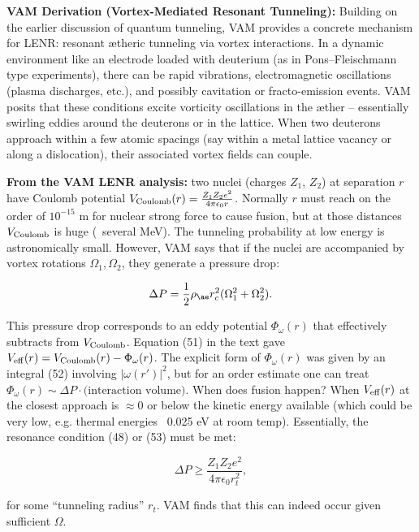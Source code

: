 \documentclass[a4paper, aps,preprint,superscriptaddress, 12pt]{revtex4}
\begin{document}
\textbf{VAM Derivation (Vortex-Mediated Resonant Tunneling):} Building on the earlier discussion of quantum tunneling, VAM provides a concrete mechanism for LENR: resonant ætheric tunneling via vortex interactions. In a dynamic environment like an electrode loaded with deuterium (as in Pons–Fleischmann type experiments), there can be rapid vibrations, electromagnetic oscillations (plasma discharges, etc.), and possibly cavitation or fracto-emission events. VAM posits that these conditions excite vorticity oscillations in the æther – essentially swirling eddies around the deuterons or in the lattice. When two deuterons approach within a few atomic spacings (say within a metal lattice vacancy or along a dislocation), their associated vortex fields can couple.


\textbf{From the VAM LENR analysis:} two nuclei (charges $Z_1$, $Z_2$) at separation $r$ have Coulomb potential $V_{\rm Coulomb}(r) = \frac{Z_1 Z_2 e^2}{4\pi\epsilon_0 r}$. Normally $r$ must reach on the order of $10^{-15}$ m for nuclear strong force to cause fusion, but at those distances $V_{\rm Coulomb}$ is huge (~several MeV). The tunneling probability at low energy is astronomically small. However, VAM says that if the nuclei are accompanied by vortex rotations $\Omega_1, \Omega_2$, they generate a pressure drop:

\begin{equation}
    \Delta P = \frac{1}{2}\rho_{\ae} r_c^2 (\Omega_1^2+\Omega_2^2).
\end{equation}

This pressure drop corresponds to an eddy potential $\Phi_\omega(r)$ that effectively subtracts from $V_{\rm Coulomb}$. Equation (51) in the text gave $V_{\rm eff}(r) = V_{\rm Coulomb}(r) - \Phi_\omega(r)$. The explicit form of $\Phi_\omega(r)$ was given by an integral (52) involving $|\omega(r')|^2$, but for an order estimate one can treat $\Phi_\omega(r)\sim \Delta P \cdot \text{(interaction volume)}$. When does fusion happen? When $V_{\rm eff}(r)$ at the closest approach is $\approx 0$ or below the kinetic energy available (which could be very low, e.g. thermal energies ~0.025 eV at room temp). Essentially, the resonance condition (48) or (53) must be met:

\begin{equation}
    \Delta P \ge \frac{Z_1Z_2 e^2}{4\pi\epsilon_0 r_t^2},
\end{equation}

for some “tunneling radius” $r_t$. VAM finds that this can indeed occur given sufficient $\Omega$.
\end{document}
